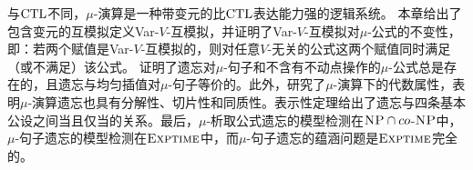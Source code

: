 与$\textrm{CTL}$不同，$\mu$-演算是一种带变元的比$\textrm{CTL}$表达能力强的逻辑系统。
本章给出了包含变元的互模拟定义Var-$V$-互模拟，并证明了Var-$V$-互模拟对$\mu$-公式的不变性，即：若两个赋值是Var-$V$-互模拟的，则对任意$V$-无关的公式这两个赋值同时满足（或不满足）该公式。
证明了遗忘对$\mu$-句子和不含有不动点操作的$\mu$-公式总是存在的，且遗忘与均匀插值对$\mu$-句子等价的。此外，研究了$\mu$-演算下的代数属性，表明$\mu$-演算遗忘也具有分解性、切片性和同质性。表示性定理给出了遗忘与四条基本公设之间当且仅当的关系。最后，$\mu$-析取公式遗忘的模型检测在$\textsc{NP}\cap co$-$\textsc{NP}$中，$\mu$-句子遗忘的模型检测在$\textsc{Exptime}$中，而$\mu$-句子遗忘的蕴涵问题是$\textsc{Exptime}$完全的。



